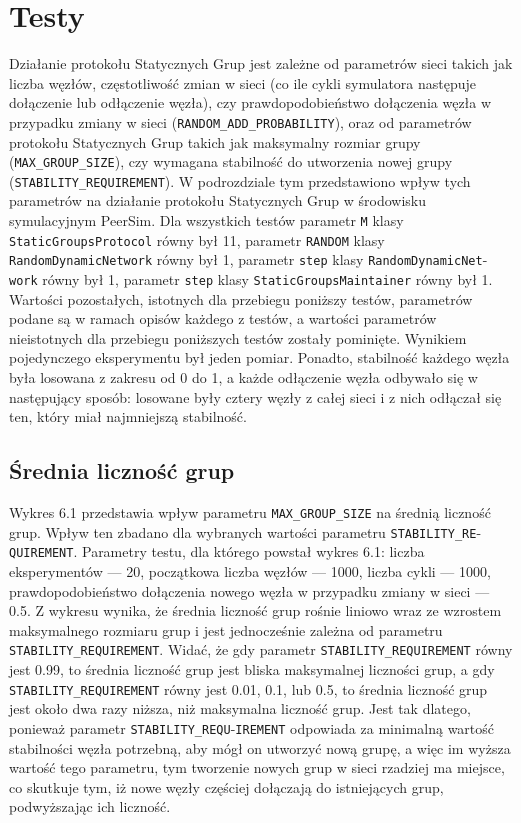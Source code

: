 \documentclass[12pt, twoside, openany]{report}
\begin{document}
\section{Testy}
Działanie protokołu Statycznych Grup jest zależne od parametrów sieci takich jak liczba węzłów, częstotliwość zmian w sieci (co ile cykli symulatora następuje dołączenie lub odłączenie węzła), czy prawdopodobieństwo  dołączenia węzła w przypadku zmiany w sieci (\texttt{RANDOM\_ADD\_PROBABILITY}), oraz od parametrów protokołu Statycznych Grup takich jak maksymalny rozmiar grupy (\texttt{MAX\_GROUP\_SIZE}), czy wymagana stabilność do utworzenia nowej grupy (\texttt{STABILITY\_REQUIREMENT}). W podrozdziale tym przedstawiono wpływ tych parametrów na działanie protokołu Statycznych Grup w środowisku symulacyjnym PeerSim. Dla wszystkich testów parametr \texttt{M} klasy \texttt{StaticGroupsProtocol} równy był 11, parametr \texttt{RANDOM} klasy \texttt{RandomDynamicNetwork} równy był 1, parametr \texttt{step} klasy \texttt{RandomDynamicNet}-\texttt{work} równy był 1, parametr \texttt{step} klasy \texttt{StaticGroupsMaintainer} równy był 1. Wartości pozostałych, istotnych dla przebiegu poniższy testów, parametrów podane są w ramach opisów każdego z testów, a wartości parametrów nieistotnych dla przebiegu poniższych testów zostały pominięte. Wynikiem pojedynczego eksperymentu był jeden pomiar. Ponadto, stabilność każdego węzła była losowana z zakresu od 0 do 1, a każde odłączenie węzła odbywało się w następujący sposób: losowane były cztery węzły z całej sieci i z nich odłączał się ten, który miał najmniejszą stabilność.

\subsection{Średnia liczność grup}

Wykres 6.1 przedstawia wpływ parametru \texttt{MAX\_GROUP\_SIZE} na średnią liczność grup. Wpływ ten zbadano dla wybranych wartości parametru \texttt{STABILITY\_RE}-\texttt{QUIREMENT}. Parametry testu, dla którego powstał wykres 6.1: liczba eksperymentów --- 20, początkowa liczba węzłów --- 1000, liczba cykli --- 1000, prawdopodobieństwo dołączenia nowego węzła w przypadku zmiany w sieci --- 0.5. Z wykresu wynika, że średnia liczność grup rośnie liniowo wraz ze wzrostem maksymalnego rozmiaru grup i jest jednocześnie zależna od parametru \texttt{STABILITY\_REQUIREMENT}. Widać, że gdy parametr \texttt{STABILITY\_REQUIREMENT} równy jest 0.99, to średnia liczność grup jest bliska maksymalnej liczności grup, a gdy \texttt{STABILITY\_REQUIREMENT} równy jest 0.01, 0.1, lub 0.5, to średnia liczność grup jest około dwa razy niższa, niż maksymalna liczność grup. Jest tak dlatego, ponieważ parametr \texttt{STABILITY\_REQU}-\texttt{IREMENT} odpowiada za minimalną wartość stabilności węzła potrzebną, aby mógł on utworzyć nową grupę, a więc im wyższa wartość tego parametru, tym tworzenie nowych grup w sieci rzadziej ma miejsce, co skutkuje tym, iż nowe węzły częściej dołączają do istniejących grup, podwyższając ich liczność.
\end{document}
